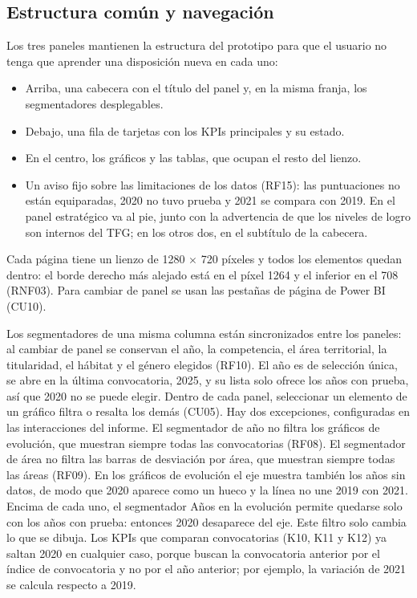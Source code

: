 \documentclass[12pt, a4paper, oneside]{report}
\begin{document}
\subsection{Estructura común y navegación}
\label{sec:estructura_comun}
Los tres paneles mantienen la estructura del prototipo para que el usuario no tenga que aprender una disposición nueva en cada uno:
\begin{itemize}
    \item Arriba, una cabecera con el título del panel y, en la misma franja, los segmentadores desplegables.
    \item Debajo, una fila de tarjetas con los KPIs principales y su estado.
    \item En el centro, los gráficos y las tablas, que ocupan el resto del lienzo.
    \item Un aviso fijo sobre las limitaciones de los datos (RF15): las puntuaciones no están equiparadas, 2020 no tuvo prueba y 2021 se compara con 2019. En el panel estratégico va al pie, junto con la advertencia de que los niveles de logro son internos del TFG; en los otros dos, en el subtítulo de la cabecera.
\end{itemize}

Cada página tiene un lienzo de 1280 $\times$ 720 píxeles y todos los elementos quedan dentro: el borde derecho más alejado está en el píxel 1264 y el inferior en el 708 (RNF03). Para cambiar de panel se usan las pestañas de página de Power BI (CU10).

Los segmentadores de una misma columna están sincronizados entre los paneles: al cambiar de panel se conservan el año, la competencia, el área territorial, la titularidad, el hábitat y el género elegidos (RF10). El año es de selección única, se abre en la última convocatoria, 2025, y su lista solo ofrece los años con prueba, así que 2020 no se puede elegir. Dentro de cada panel, seleccionar un elemento de un gráfico filtra o resalta los demás (CU05). Hay dos excepciones, configuradas en las interacciones del informe. El segmentador de año no filtra los gráficos de evolución, que muestran siempre todas las convocatorias (RF08). El segmentador de área no filtra las barras de desviación por área, que muestran siempre todas las áreas (RF09). En los gráficos de evolución el eje muestra también los años sin datos, de modo que 2020 aparece como un hueco y la línea no une 2019 con 2021. Encima de cada uno, el segmentador \guillemotleft{}Años en la evolución\guillemotright{} permite quedarse solo con los años con prueba: entonces 2020 desaparece del eje. Este filtro solo cambia lo que se dibuja. Los KPIs que comparan convocatorias (K10, K11 y K12) ya saltan 2020 en cualquier caso, porque buscan la convocatoria anterior por el índice de convocatoria y no por el año anterior; por ejemplo, la variación de 2021 se calcula respecto a 2019.
\end{document}
